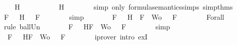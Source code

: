 \begin{isabellebody}
\ {\isachardoublequoteopen}{\isasymnot}\ {\isacharparenleft}{\isasymA}\ {\isasymTurnstile}\ H{\isacharparenright}{\isachardoublequoteclose}\isanewline
\ \ \ \ \isamarkupfalse%
\ \isamarkupfalse%
\ {\isachardoublequoteopen}{\isasymA}\ {\isasymTurnstile}\ \isactrlbold {\isasymnot}\ H{\isachardoublequoteclose}\isanewline
\ \ \ \ \ \ \isamarkupfalse%
\ {\isacharparenleft}simp\ only{\isacharcolon}\ formula{\isacharunderscore}semantics{\isachardot}simps{\isacharparenleft}{}{\isacharparenright}\ simp{\isacharunderscore}thms{\isacharparenleft}{}{\isacharparenright}{\isacharparenright}\isanewline
\ \ \ \ \isamarkupfalse%
\ \isamarkupfalse%
\ {\isachardoublequoteopen}{\isasymforall}F\ {\isasymin}\ {\isacharbraceleft}\isactrlbold {\isasymnot}\ H{\isacharbraceright}{\isachardot}\ {\isasymA}\ {\isasymTurnstile}\ F{\isachardoublequoteclose}\isanewline
\ \ \ \ \ \ \isamarkupfalse%
\ simp\isanewline
\ \ \ \ \isamarkupfalse%
\ \isamarkupfalse%
\ {\isachardoublequoteopen}{\isasymforall}F\ {\isasymin}\ {\isacharparenleft}{\isacharbraceleft}\isactrlbold {\isasymnot}\ H{\isacharbraceright}\ {\isasymunion}\ {\isacharparenleft}{\isacharbraceleft}F{\isacharbraceright}\ {\isasymunion}\ Wo{\isacharparenright}{\isacharparenright}{\isachardot}\ {\isasymA}\ {\isasymTurnstile}\ F{\isachardoublequoteclose}\isanewline
\ \ \ \ \ \ \isamarkupfalse%
\ Forall{}\ \isamarkupfalse%
\ {\isacharparenleft}rule\ ball{\isacharunderscore}Un{\isacharparenright}\isanewline
\ \ \ \ \isamarkupfalse%
\ \isamarkupfalse%
\ {\isachardoublequoteopen}{\isasymforall}F\ {\isasymin}\ {\isacharbraceleft}\isactrlbold {\isasymnot}\ H{\isacharcomma}F{\isacharbraceright}\ {\isasymunion}\ Wo{\isachardot}\ {\isasymA}\ {\isasymTurnstile}\ F{\isachardoublequoteclose}\isanewline
\ \ \ \ \ \ \isamarkupfalse%
\ simp\isanewline
\ \ \ \ \isamarkupfalse%
\ \isamarkupfalse%
\ {\isachardoublequoteopen}{\isasymexists}{\isasymA}{\isachardot}\ {\isasymforall}F\ {\isasymin}\ {\isacharparenleft}{\isacharbraceleft}\isactrlbold {\isasymnot}\ H{\isacharcomma}F{\isacharbraceright}\ {\isasymunion}\ Wo{\isacharparenright}{\isachardot}\ {\isasymA}\ {\isasymTurnstile}\ F{\isachardoublequoteclose}\isanewline
\ \ \ \ \ \ \isamarkupfalse%
\ {\isacharparenleft}iprover\ intro{\isacharcolon}\ exI{\isacharparenright}\isanewline
\ \ \ \ \isamarkupfalse%

\end{isabellebody}
